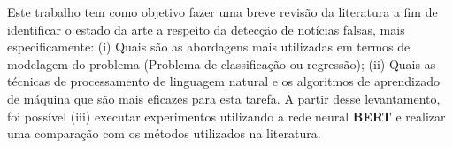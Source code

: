 
Este trabalho tem como objetivo fazer uma breve revisão da literatura a fim de identificar o estado da arte a respeito da detecção de notícias falsas, mais especificamente: (i) Quais são as abordagens mais utilizadas em termos de modelagem do problema (Problema de classificação ou regressão); (ii) Quais as técnicas de processamento de linguagem natural e os algoritmos de aprendizado de máquina que são mais eficazes para esta tarefa. A partir desse levantamento, foi possível  (iii) executar experimentos utilizando a rede neural \textbf{BERT} e realizar uma comparação com os métodos utilizados na literatura.



